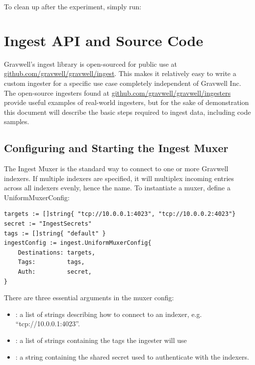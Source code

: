 To clean up after the experiment, simply run:





\section{Ingest API and Source Code}

Gravwell's ingest library is open-sourced for public use at
\href{github.com/gravwell/gravwell/tree/master/ingest}{github.com/gravwell/gravwell/ingest}.
This makes it relatively easy to write a custom ingester for a specific
use case completely independent of Gravwell Inc. The open-source
ingesters found at
\href{github.com/gravwell/gravwell/tree/master/ingesters}{github.com/gravwell/gravwell/ingesters} provide
useful examples of real-world ingesters, but for the sake of
demonstration this document will describe the basic steps required to
ingest data, including code samples.

\subsection{Configuring and Starting the Ingest Muxer}

The Ingest Muxer is the standard way to connect to one or more Gravwell
indexers. If multiple indexers are specified, it will multiplex incoming
entries across all indexers evenly, hence the name. To instantiate a
muxer, define a UniformMuxerConfig:

\begin{Verbatim}[breaklines=true]
targets := []string{ "tcp://10.0.0.1:4023", "tcp://10.0.0.2:4023"}
secret := "IngestSecrets"
tags := []string{ "default" }
ingestConfig := ingest.UniformMuxerConfig{
    Destinations: targets,
    Tags:         tags,
    Auth:         secret,
}
\end{Verbatim}

There are three essential arguments in the muxer config:

\begin{itemize}
\item
  : a list of strings describing how to connect to an
  indexer, e.g. ``tcp://10.0.0.1:4023''.
\item
  : a list of strings containing the tags the ingester will use
\item
  : a string containing the shared secret used to authenticate with
  the indexers.
\end{itemize}

